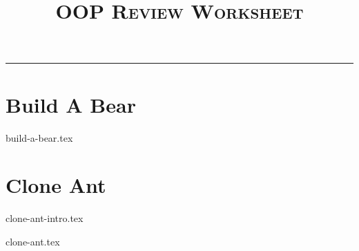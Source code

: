 \documentclass{exam}
\title{\textsc{OOP Review Worksheet}}
\begin{document}
\maketitle
\rule{\textwidth}{0.15em}
\fontsize{12}{15}\selectfont

\section{Build A Bear}
\begin{questions}
{build-a-bear.tex}
\end{questions}
\newpage
\section{Clone Ant}

{clone-ant-intro.tex}

\begin{questions}
{clone-ant.tex}
\end{questions}
\end{document}
